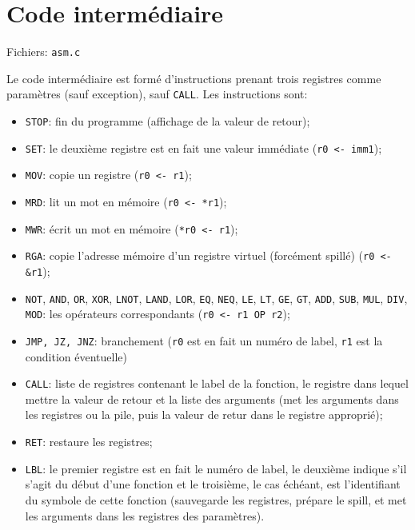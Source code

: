 \documentclass{article}
\begin{document}
	\section{Code intermédiaire}
		\par Fichiers: \verb#asm.c#
		\par Le code intermédiaire est formé d'instructions prenant trois registres comme paramètres (sauf exception), sauf \verb#CALL#. Les instructions sont:
		\begin{itemize}
			\item \verb#STOP#: fin du programme (affichage de la valeur de retour);
			\item \verb#SET#: le deuxième registre est en fait une valeur immédiate (\verb#r0 <- imm1#);
			\item \verb#MOV#: copie un registre (\verb#r0 <- r1#);
			\item \verb#MRD#: lit un mot en mémoire (\verb#r0 <- *r1#);
			\item \verb#MWR#: écrit un mot en mémoire (\verb#*r0 <- r1#);
			\item \verb#RGA#: copie l'adresse mémoire d'un registre virtuel (forcément spillé) (\verb#r0 <- &r1#);
			\item \verb#NOT#, \verb#AND#, \verb#OR#, \verb#XOR#, \verb#LNOT#, \verb#LAND#, \verb#LOR#, \verb#EQ#, \verb#NEQ#, \verb#LE#, \verb#LT#, \verb#GE#, \verb#GT#, \verb#ADD#, \verb#SUB#, \verb#MUL#, \verb#DIV#, \verb#MOD#: les opérateurs correspondants (\verb#r0 <- r1 OP r2#);
			\item \verb#JMP, JZ, JNZ#: branchement (\verb#r0# est en fait un numéro de label, \verb#r1# est la condition éventuelle)
			\item \verb#CALL#: liste de registres contenant le label de la fonction, le registre dans lequel mettre la valeur de retour et la liste des arguments (met les arguments dans les registres ou la pile, puis la valeur de retur dans le registre approprié);
			\item \verb#RET#: restaure les registres;
			\item \verb#LBL#: le premier registre est en fait le numéro de label, le deuxième indique s'il s'agit du début d'une fonction et le troisième, le cas échéant, est l'identifiant du symbole de cette fonction (sauvegarde les registres, prépare le spill, et met les arguments dans les registres des paramètres).
		\end{itemize}
\end{document}
